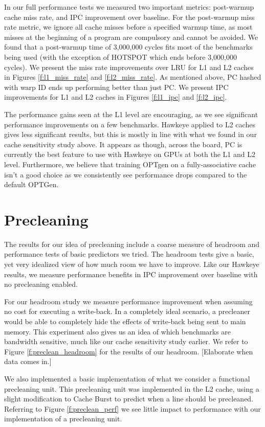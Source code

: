 In our full performance tests we measured two important metrics: post-warmup cache miss rate, and IPC improvement over baseline. For the post-warmup miss rate metric, we ignore all cache misses before a specified warmup time, as most misses at the beginning of a program are compulsory and cannot be avoided. We found that a post-warmup time of 3,000,000 cycles fits most of the benchmarks being used (with the exception of HOTSPOT which ends before 3,000,000 cycles). We present the miss rate improvements over LRU for L1 and L2 caches in Figures \ref{f:l1_miss_rate} and \ref{f:l2_miss_rate}. As mentioned above, PC hashed with warp ID ends up performing better than just PC. We present IPC improvements for L1 and L2 caches in Figures \ref{f:l1_ipc} and \ref{f:l2_ipc}.

The performance gains seen at the L1 level are encouraging, as we see significant performance improvements on a few benchmarks. Hawkeye applied to L2 caches gives less significant results, but this is mostly in line with what we found in our cache sensitivity study above. It appears as though, across the board, PC is currently the best feature to use with Hawkeye on GPUs at both the L1 and L2 level. Furthermore, we believe that training OPTgen on a fully-associative cache isn't a good choice as we consistently see performance drops compared to the default OPTGen.

\section{Precleaning}

The results for our idea of precleaning include a coarse measure of headroom and performance tests of basic predictors we tried. The headroom tests give a basic, yet very idealized view of how much room we have to improve. Like our Hawkeye results, we measure performance benefits in IPC improvement over baseline with no precleaning enabled.

For our headroom study we measure performance improvement when assuming no cost for executing a write-back. In a completely ideal scenario, a precleaner would be able to completely hide the effects of write-back being sent to main memory. This experiment also gives us an idea of which benchmarks are bandwidth sensitive, much like our cache sensitivity study earlier. We refer to Figure \ref{f:preclean_headroom} for the results of our headroom. [Elaborate when data comes in.]

We also implemented a basic implementation of what we consider a functional precleaning unit. This precleaning unit was implemented in the L2 cache, using a slight modification to Cache Burst \cite{cache_burst} to predict when a line should be precleaned. Referring to Figure \ref{f:preclean_perf} we see little impact to performance with our implementation of a precleaning unit.

